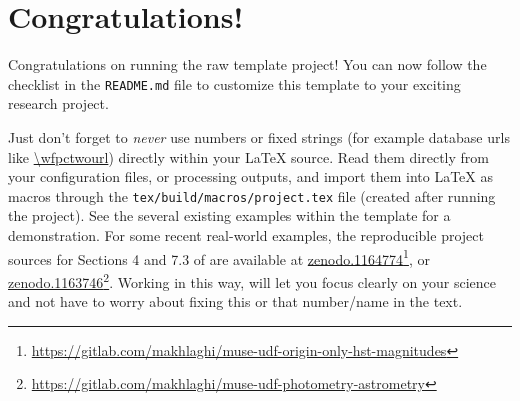 \documentclass[10pt, twocolumn]{article}
\begin{document}

\thispagestyle{firststyle}





\section{Congratulations!}
Congratulations on running the raw template project! You can now follow the
checklist in the \texttt{README.md} file to customize this template to your
exciting research project.

Just don't forget to \emph{never} use numbers or fixed strings (for example
database urls like \url{\wfpctwourl}) directly within your \LaTeX{}
source. Read them directly from your configuration files, or processing
outputs, and import them into \LaTeX{} as macros through the
\texttt{tex/build/macros/project.tex} file (created after running the
project). See the several existing examples within the template for a
demonstration. For some recent real-world examples, the reproducible
project sources for Sections 4 and 7.3 of \citet{bacon17} are available at
\href{https://doi.org/10.5281/zenodo.1164774}{zenodo.1164774}\footnote{\url{https://gitlab.com/makhlaghi/muse-udf-origin-only-hst-magnitudes}},
or
\href{https://doi.org/10.5281/zenodo.1163746}{zenodo.1163746}\footnote{\url{https://gitlab.com/makhlaghi/muse-udf-photometry-astrometry}}. Working
in this way, will let you focus clearly on your science and not have to
worry about fixing this or that number/name in the text.
\end{document}

